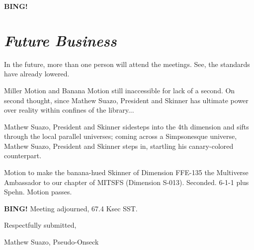 \documentclass[10pt]{article}
\newcommand{\bing}{{\bf BING!} }
\newcommand{\goto}[1]{\bing \vskip 12pt \section*{{\em{#1}}}}
\newcommand{\ps}{plus Spehn}
\newcommand{\skinner}{Mathew Suazo, President and Skinner }
\newcommand{\onseck}{Mathew Suazo, Pseudo-Onseck}
\begin{document}
\goto{Future Business}

In the future, more than one person will attend the meetings. See, the standards have already lowered.

Miller Motion and Banana Motion still inaccessible for lack of a second. On second thought, since \skinner has ultimate power over reality within confines of the library...

\skinner sidesteps into the 4th dimension and sifts through the local parallel universes; coming across a Simpsonesque universe, \skinner steps in, startling his canary-colored counterpart.

Motion to make the banana-hued Skinner of Dimension FFE-135 the Multiverse Ambassador to our chapter of MITSFS (Dimension S-013). Seconded. 6-1-1 \ps . Motion passes.

\bing
\noindent
Meeting adjourned, 67.4 Ksec SST.

\vspace{18pt}

\centerline{Respectfully submitted,}
\centerline{\onseck}
\end{document}
